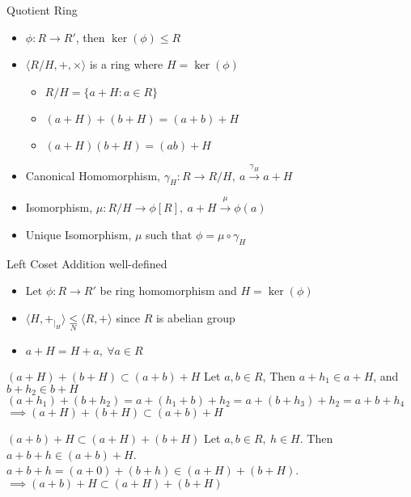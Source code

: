 \documentclass{beamer}
\newcommand{\subgroup}{\le}
\newcommand{\subring}{\le}
\begin{document}
\begin{frame}{Quotient Ring}
\begin{itemize}
	\item $\phi : R \to R'$, then $\ker(\phi) \subring R$
	\item $\langle R/H,+,\times \rangle$ is a ring where $H = \ker(\phi)$
	\begin{itemize}
		\item $R/H = \{ a+H : a \in R \}$
		\item $(a+H) + (b+H) = (a+b) + H$
		\item $(a+H)(b+H) = (ab)+H$
	\end{itemize}
	\item Canonical Homomorphism, $\gamma_H : R \to R/H,\ a \xrightarrow{\gamma_H} a+H$
	\item Isomorphism, $\mu : R/H \to \phi[R],\ a+H \xrightarrow{\mu} \phi(a)$
	\item Unique Isomorphism, $\mu$ such that $\phi = \mu \circ \gamma_H$
\end{itemize}
\begin{figure}
\end{figure}
\end{frame}

\begin{frame}{Left Coset Addition well-defined}
\begin{itemize}
	\item Let $\phi : R \to R'$ be ring homomorphism and $H = \ker(\phi)$
	\item $\langle H,+_{|_H} \rangle \underset{N}{\subgroup} \langle R,+ \rangle$  since $R$ is abelian group
	\item $a+H = H+a,\ \forall a \in R$
\end{itemize}

\begin{block}{$(a+H)+(b+H) \subset (a+b)+H$}
	Let $a,b \in R$, Then $a+h_1 \in a+H$, and $b+h_2 \in b+H$\\
	$(a+h_1)+(b+h_2)  = a+(h_1+b)+h_2 = a+(b+h_3)+h_2  = a+b+h_4$ \\
	$\implies  (a+H) + (b+H) \subset (a+b) + H$
\end{block}
\begin{block}{$(a+b)+H \subset (a+H)+(b+H)$}
	Let $a,b \in R,\ h \in H$. Then $a+b+h \in (a+b)+H$.\\
	$a+b+h = (a+0)+(b+h) \in (a+H)+(b+H)$.\\
	$\implies (a+b)+H \subset (a+H)+(b+H)$
\end{block}
\end{frame}
\end{document}
